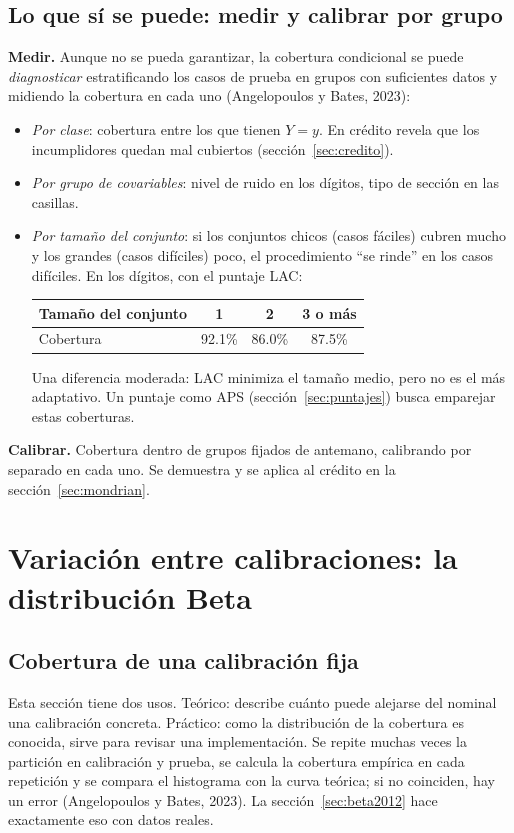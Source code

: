 \documentclass[11pt]{article}
\theoremstyle{plain}
\theoremstyle{definition}
\theoremstyle{remark}
\newcommand{\dest}[1]{\par\needspace{4\baselineskip}\textbf{#1}\quad}
\newcommand{\lamina}[1]{}%
\begin{document}
\subsection{Lo que sí se puede: medir y calibrar por grupo}
\dest{Medir.} Aunque no se pueda garantizar, la cobertura condicional se puede \emph{diagnosticar}
estratificando los casos de prueba en grupos con suficientes datos y midiendo la cobertura en cada
uno (Angelopoulos y Bates, 2023):
\begin{itemize}
\item \emph{Por clase}: cobertura entre los que tienen $Y=y$. En crédito revela que los incumplidores
quedan mal cubiertos (sección~\ref{sec:credito}).
\item \emph{Por grupo de covariables}: nivel de ruido en los dígitos, tipo de sección en las casillas.
\item \emph{Por tamaño del conjunto}: si los conjuntos chicos (casos fáciles) cubren mucho y los grandes
(casos difíciles) poco, el procedimiento ``se rinde'' en los casos difíciles. En los dígitos, con el
puntaje LAC:
\begin{center}
\begin{tabular}{lccc}
\toprule
Tamaño del conjunto & 1 & 2 & 3 o más\\
\midrule
Cobertura & 92.1\% & 86.0\% & 87.5\%\\
\bottomrule
\end{tabular}
\end{center}
Una diferencia moderada: LAC minimiza el tamaño medio, pero no es el más adaptativo. Un puntaje como
APS (sección~\ref{sec:puntajes}) busca emparejar estas coberturas.
\end{itemize}

\dest{Calibrar.} Cobertura dentro de grupos fijados de antemano, calibrando por separado en cada uno.
Se demuestra y se aplica al crédito en la sección~\ref{sec:mondrian}.
\section{Variación entre calibraciones: la distribución Beta}\label{sec:beta}\lamina{17--18}
\subsection{Cobertura de una calibración fija}
Esta sección tiene dos usos. Teórico: describe cuánto puede alejarse del nominal una calibración
concreta. Práctico: como la distribución de la cobertura es conocida, sirve para revisar una
implementación. Se repite muchas veces la partición en calibración y prueba, se calcula la cobertura
empírica en cada repetición y se compara el histograma con la curva teórica; si no coinciden, hay un
error (Angelopoulos y Bates, 2023). La sección~\ref{sec:beta2012} hace exactamente eso con datos
reales.
\end{document}
